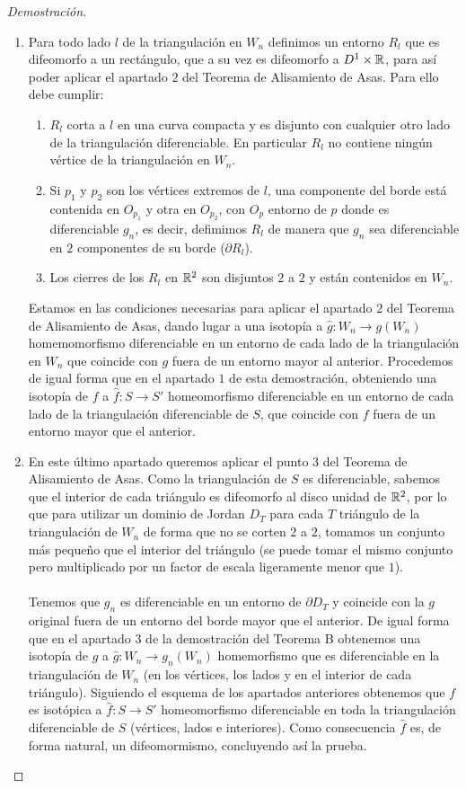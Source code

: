 \begin{proof}[Demostración]
\begin{enumerate}
			\item Para todo lado $l$ de la triangulación en $W_n$ definimos un entorno $R_l$ que es difeomorfo a un rectángulo, que a su vez es difeomorfo a $D^1 \times \mathbb{R}$, para así poder aplicar el apartado $2$ del Teorema de Alisamiento de Asas. Para ello debe cumplir:
			\begin{enumerate}
				\item $R_l$ corta a $l$ en una curva compacta y es disjunto con cualquier otro lado de la triangulación diferenciable. En particular $R_l$ no contiene ningún vértice de la triangulación en $W_n$.
				\item Si $p_1$ y $p_2$ son los vértices extremos de $l$, una componente del borde está contenida en $O_{p_1}$ y otra en $O_{p_2}$, con $O_p$ entorno de $p$ donde es diferenciable $g_n$, es decir, defimimos $R_l$ de manera que $g_n$ sea diferenciable en $2$ componentes de su borde ($\partial R_l$).
				\item Los cierres de los $R_l$ en $\mathbb{R}^2$ son disjuntos $2$ a $2$ y están contenidos en $W_n$.
			\end{enumerate}
			Estamos en las condiciones necesarias para aplicar el apartado $2$ del Teorema de Alisamiento de Asas, dando lugar a una isotopía a $\widehat{g} : W_n \rightarrow g(W_n)$ homemomorfismo diferenciable en un entorno de cada lado de la triangulación en $W_n$ que coincide con $g$ fuera de un entorno mayor al anterior. Procedemos de igual forma que en el apartado $1$ de esta demostración, obteniendo una isotopía de $f$ a $\widehat{f} : S \rightarrow S'$ homeomorfismo diferenciable en un entorno de cada lado de la triangulación diferenciable de $S$, que coincide con $f$ fuera de un entorno mayor que el anterior.
			\item En este último apartado queremos aplicar el punto $3$ del Teorema de Alisamiento de Asas. Como la triangulación de $S$ es diferenciable, sabemos que el interior de cada triángulo es difeomorfo al disco unidad de $\mathbb{R}^2$, por lo que para utilizar un dominio de Jordan $D_T$ para cada $T$ triángulo de la triangulación de $W_n$ de forma que no se corten $2$ a $2$, tomamos un conjunto más pequeño que el interior del triángulo (se puede tomar el mismo conjunto pero multiplicado por un factor de escala ligeramente menor que $1$).\\
			\\ Tenemos que $g_n$ es diferenciable en un entorno de $\partial D_T$ y coincide con la $g$ original fuera de un entorno del borde mayor que el anterior. De igual forma que en el apartado $3$ de la demostración del Teorema B obtenemos una isotopía de $g$ a $\widehat{g} : W_n \rightarrow g_n(W_n)$ homemorfismo que es diferenciable en la triangulación de $W_n$ (en los vértices, los lados y en el interior de cada triángulo). Siguiendo el esquema de los apartados anteriores obtenemos que $f$ es isotópica a $\widehat{f}: S \rightarrow S'$ homeomorfismo diferenciable en toda la triangulación diferenciable de $S$ (vértices, lados e interiores). Como consecuencia $\widehat{f}$ es, de forma natural, un difeomormismo, concluyendo así la prueba.
		\end{enumerate}
	\end{proof}
\endinput
